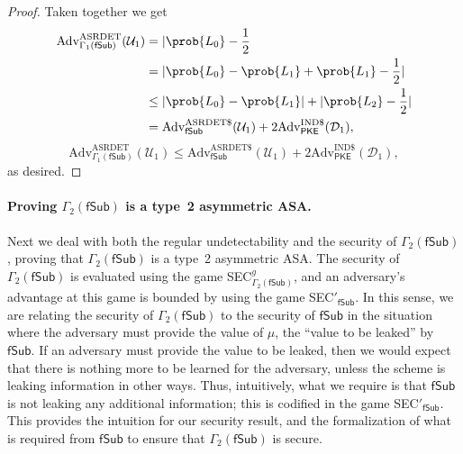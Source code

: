 \begin{proof}
Taken together we get
\iffullversion
\begin{align*}
\mathrm{Adv}^\mathrm{ASRDET}_{\Gamma_1(\mathsf{fSub})}(\mathcal{U}_1)
&= |\prob{L_0}-\frac{1}{2} \\
&= |\prob{L_0}-\prob{L_1}+\prob{L_1}-\frac{1}{2}| \\
&\le |\prob{L_0}-\prob{L_1}|+|\prob{L_2}-\frac{1}{2}| \\
&= \mathrm{Adv}^{\mathrm{ASRDET}\$}_{\mathsf{fSub}}(\mathcal{U}_1) + 2\mathrm{Adv}^{\mathrm{IND}\$}_\mathsf{PKE}(\mathcal{D}_1),
\end{align*}
\else
\[
\mathrm{Adv}^\mathrm{ASRDET}_{\Gamma_1(\mathsf{fSub})}(\mathcal{U}_1) \le \mathrm{Adv}^{\mathrm{ASRDET}\$}_{\mathsf{fSub}}(\mathcal{U}_1) + 2\mathrm{Adv}^{\mathrm{IND}\$}_\mathsf{PKE}(\mathcal{D}_1),
\]
\fi
as desired.
\end{proof}


\paragraph{Proving $\Gamma_2(\mathsf{fSub})$ is a type~2 asymmetric ASA.} Next we deal with both the regular undetectability and the security of $\Gamma_2(\mathsf{fSub})$, proving that $\Gamma_2(\mathsf{fSub})$ is a type~2 asymmetric ASA. The security of $\Gamma_2(\mathsf{fSub})$ is evaluated using the game SEC$^g_{\Gamma_2(\mathsf{fSub})}$, and an adversary's advantage at this game is bounded by using the game SEC$'_\mathsf{fSub}$. In this sense, we are relating the security of $\Gamma_2(\mathsf{fSub})$ to the security of $\mathsf{fSub}$ in the situation where the adversary must provide the value of $\mu$, the ``value to be leaked'' by $\mathsf{fSub}$. If an adversary must provide the value to be leaked, then we would expect that there is nothing more to be learned for the adversary, unless the scheme is leaking information in other ways. Thus, intuitively, what we require is that $\mathsf{fSub}$ is not leaking any additional information; this is codified in the game SEC$'_\mathsf{fSub}$. This provides the intuition for our security result, and the formalization of what is required from $\mathsf{fSub}$ to ensure that $\Gamma_2(\mathsf{fSub})$ is secure.

